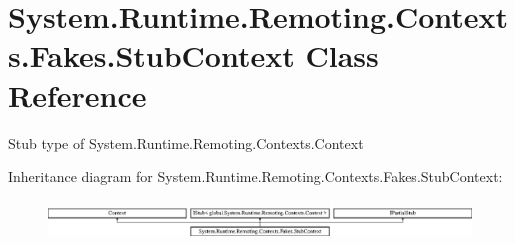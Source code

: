 \hypertarget{class_system_1_1_runtime_1_1_remoting_1_1_contexts_1_1_fakes_1_1_stub_context}{\section{System.\-Runtime.\-Remoting.\-Contexts.\-Fakes.\-Stub\-Context Class Reference}
\label{class_system_1_1_runtime_1_1_remoting_1_1_contexts_1_1_fakes_1_1_stub_context}
}


Stub type of System.\-Runtime.\-Remoting.\-Contexts.\-Context 


Inheritance diagram for System.\-Runtime.\-Remoting.\-Contexts.\-Fakes.\-Stub\-Context\-:\begin{figure}[H]
\begin{center}
\leavevmode
\includegraphics[height=1.063628cm]{class_system_1_1_runtime_1_1_remoting_1_1_contexts_1_1_fakes_1_1_stub_context}
\end{center}
\end{figure}
